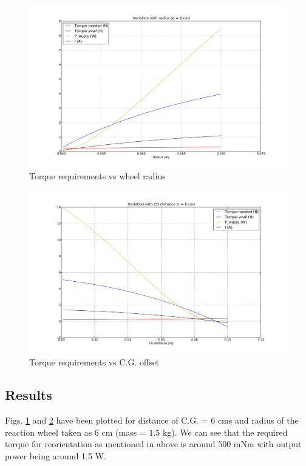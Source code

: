 \begin{figure}[!h]
\centering
\includegraphics[scale=0.4]{fig/rewac_radius.pdf}
\caption{Torque requirements vs wheel radius}
\label{fig:4_rewac_radius}
\end{figure}
\begin{figure}[!h]
\centering
\includegraphics[scale=0.4]{fig/rewac_dist.pdf}
\caption{Torque requirements vs C.G. offset}
\label{fig:4_rewac_dist}
\end{figure}

\subsection*{Results}
Figs. \ref{fig:4_rewac_radius} and \ref{fig:4_rewac_dist} have been plotted for distance of C.G. = 6 cms and
radius of the reaction wheel taken as 6 cm (mass = 1.5 kg). We can see that the required torque for reorientation as mentioned in above is around 500 mNm with output power being around 1.5 W.


